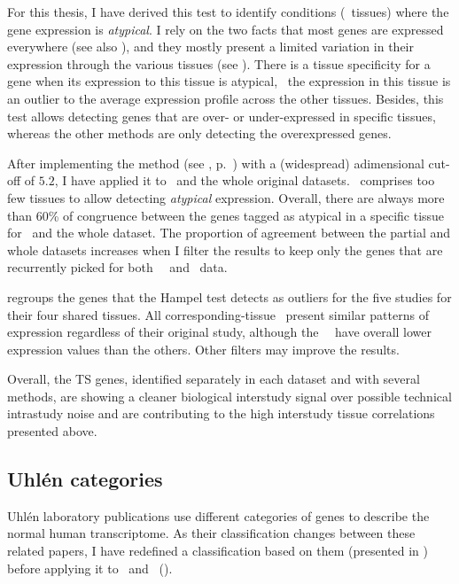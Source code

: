 For this thesis, I have derived this test to identify conditions (\ie\ tissues)
where the gene expression is \emph{atypical}.
I rely on the two facts that
most genes are expressed everywhere 
(see also ),
and they mostly present a limited variation in their expression
through the various tissues (see ).
There is a tissue specificity for a gene when its expression to this tissue is atypical,
\ie\ the expression in this tissue is an outlier to the average expression profile
across the other tissues.
Besides,
this test allows detecting genes that are over- or under-expressed in specific tissues,
whereas the other methods are only detecting the overexpressed genes.\mybr\

After implementing the method (see , p.~\pageref{algo:hampel})
with a (widespread) adimensional cut-off of $5.2$, %
I have applied it to \setTwo\ and the whole original datasets.
\setOne\ comprises too few tissues to allow detecting \emph{atypical} expression.
Overall, there are always more than 60\% of congruence between the genes tagged
as atypical in a specific tissue for \setTwo\ and the whole dataset.
The proportion of agreement between the partial and whole datasets increases
when I filter the results to keep only the genes that are recurrently
picked for both \uhlen\ \etal\ and \gtex\ data.\mybr\

 regroups the genes that the Hampel test detects
as outliers for the five studies for their four shared tissues.
All corresponding-tissue \treps\ present similar patterns of expression
regardless of their original study,
although the \castle\ \treps\ have overall lower expression values than the others.
Other filters may improve the results.\mybr\

Overall, the \gls{TS} genes,
identified separately in each dataset and with several methods,
are showing a cleaner biological interstudy signal
over possible technical intrastudy noise
and are contributing to the high interstudy tissue correlations
presented above.\mybr\

\subsection{Uhlén categories}\label{sub:UhlenGeneCat}

Uhlén laboratory publications 
use different categories of genes to describe the normal human transcriptome.
As their classification changes between these related papers,
I have redefined a classification based on them
(presented in )
before applying it to \setOne\ and \setTwo\ ().\mybr\

